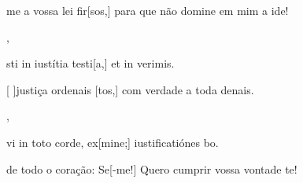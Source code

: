 {    {\item {}me a vossa lei fir[sos,] para que não domine em mim a ide!~\Antiphona},
  {\item {}sti in iustítia testi[a,] et in verimis.~\Antiphona}%
    {\item {}[ ]{jus}tiça ordenais [tos,] com verdade a toda denais.~\Antiphona},
  {\item {}vi in toto corde, ex[mine;] iustificatiónes bo.~\Antiphona}%
    {\item {} de todo o coração: Se[-me!] Quero cumprir vossa vontade te!~\Antiphona}
}